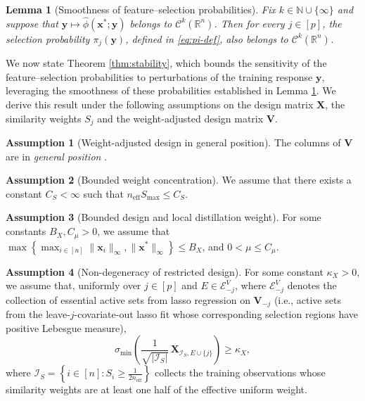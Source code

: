 \documentclass[12pt]{article}
\newcommand{\R}{\mathbb{R}}
\newtheorem{lemma}{Lemma}
\theoremstyle{definition}
\newtheorem{assumption}{Assumption}
\begin{document}
\begin{lemma}[Smoothness of feature--selection probabilities]
Fix $k\in\mathbb{N}\cup\{\infty\}$ and suppose that $\bm y\mapsto\hat\phi(\bm{x}^*; \bm{y})$ belongs to $\mathcal{C}^k(\R^n)$. Then for every
$j\in[p]$, the selection probability $\pi_j(\bm{y})$, defined in \eqref{eq:pi-def}, also belongs to $\mathcal{C}^k(\R^n)$.
\label{lem:smoothness}
\end{lemma}


We now state Theorem \ref{thm:stability}, which bounds the sensitivity of the feature--selection probabilities to perturbations of the training response $\bm{y}$, leveraging the smoothness of these probabilities established in Lemma \ref{lem:smoothness}.
We derive this result under the following assumptions on the design matrix $\bm{X}$, the similarity weights $S_j$ and the weight-adjusted design matrix $\bm{V}$.

\begin{assumption}[Weight-adjusted design in general position]
\label{assump:general-position}
The columns of $\bm{V}$ are in \textit{general position} \cite{Tibshirani2012TheLP}.
\end{assumption}

\begin{assumption}[Bounded weight concentration]
\label{assump:distillation-weight-spikiness}
We assume that there exists a constant $C_S<\infty$ such that $n_{\mathrm{eff}}S_{\max}\le C_S$.
\end{assumption}

\begin{assumption}[Bounded design and local distillation weight]
\label{assump:distillation-bounded-covariates}
For some constants $B_X,C_\mu>0$, we assume that
$\max\left\{\max_{i\in[n]}\|\boldsymbol x_i\|_\infty, \|\bm{x}^*\|_\infty \right\}\le B_X$, and $0<\mu\le C_\mu$.
\end{assumption}

\begin{assumption}[Non-degeneracy of restricted design]
\label{assump:distillation-local-nondegeneracy}
For some constant $\kappa_X>0$, we assume that, uniformly over $j\in[p]$ and $E\in\mathcal E_{-j}^V$, where $\mathcal E_{-j}^V$ denotes the collection of essential active sets from lasso regression on $\bm{V}_{-j}$ (i.e., active sets from the leave-$j$-covariate-out lasso fit whose corresponding selection regions have positive Lebesgue measure),
\[\sigma_{\min}\left(\frac{1}{\sqrt{|\mathcal I_S|}}\,\boldsymbol X_{\mathcal I_S,E\cup\{j\}}\right)\ge \kappa_X,\]
where $\mathcal I_S=\left\{i\in[n]:S_i\ge\frac{1}{2n_{\mathrm{eff}}}\right\}$ collects the training observations whose similarity weights are at least one half of the effective uniform weight.
\end{assumption}
\end{document}
